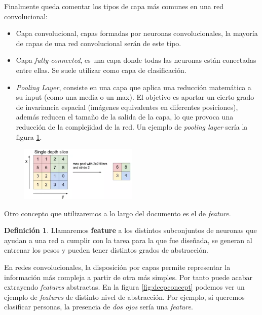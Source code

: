 \documentclass[12,twoside]{TFG-GM}
\theoremstyle{definition}
\newtheorem{definition}[theorem]{Definición}
\theoremstyle{remark}
\begin{document}
Finalmente queda comentar los tipos de capa más comunes en una red convolucional: 
\begin{itemize}
\item Capa convolucional, capas formadas por neuronas convolucionales, la mayoría de capas de una red convolucional serán de este tipo.
\item Capa \textit{fully-connected}, es una capa donde todas las neuronas están conectadas entre ellas. Se suele utilizar como capa de clasificación. 
\item \textit{Pooling Layer}, consiste en una capa que aplica una reducción matemática a su input (como una media o un max). El objetivo es aportar un cierto grado de invariancia espacial (imágenes equivalentes en diferentes posiciones), además reducen el tamaño de la salida de la capa, lo que provoca una reducción de la complejidad de la red. Un ejemplo de \textit{pooling layer} sería la figura \ref{fig:pooling}.
\end{itemize}

\begin{figure}[h]
\centering
\includegraphics[width = 0.5\textwidth]{Images/pooling1.png} 
\caption{ \label{fig:pooling}}
\end{figure}

Otro concepto que utilizaremos a lo largo del documento es el de \textit{feature}.

\begin{definition}
Llamaremos \textbf{feature} a los distintos subconjuntos de neuronas que ayudan a una red a cumplir con la tarea para la que fue diseñada, se generan al entrenar los pesos y pueden tener distintos grados de abstracción. 
\end{definition}

En redes convolucionales, la disposición por capas permite representar la información más compleja a partir de otra más simples. Por tanto puede acabar extrayendo \textit{features} abstractas. En la figura \ref{fig:deepconcept} podemos ver un ejemplo de \textit{features} de distinto nivel de abstracción. Por ejemplo, si queremos clasificar personas, la presencia de \textit{dos ojos} sería una \textit{feature}. 
\end{document}
